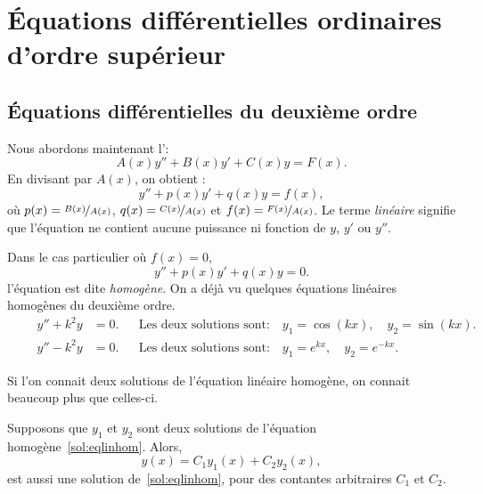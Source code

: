 \chapter{Équations différentielles ordinaires d'ordre supérieur} \label{ho:chapter}


\section{Équations différentielles du deuxième ordre}
\label{solinear:section}


Nous abordons maintenant l'\emph{}:
\begin{equation*}
	A(x) y'' + B(x)y' + C(x)y = F(x) .
\end{equation*}
En divisant par $A(x)$, on obtient : 
\begin{equation} \label{sol:eqlin}
	y'' + p(x)y' + q(x)y = f(x) ,
\end{equation}
où $p(x) = \nicefrac{B(x)}{A(x)}$, $q(x) = \nicefrac{C(x)}{A(x)}$ 
et $f(x) = \nicefrac{F(x)}{A(x)}$.
Le terme \emph{linéaire} signifie que l'équation ne contient aucune puissance ni fonction de $y$, $y'$ ou $y''$.

Dans le cas particulier où $f(x) = 0$,
\begin{equation} \label{sol:eqlinhom}
	y'' + p(x)y' + q(x)y = 0 .
\end{equation}
l'équation est dite \emph{homogène}. 
On a déjà vu quelques équations linéaires homogènes du deuxième ordre.
\begin{align*}
	\qquad y'' + k^2 y & = 0. &
	& \text{Les deux solutions sont:} \quad y_1 = \cos (kx), \quad y_2 = \sin(kx) . \qquad \\
	\qquad y'' - k^2 y & = 0. &
	& \text{Les deux solutions sont:} \quad y_1 = e^{kx}, \quad y_2 = e^{-kx} . \qquad
\end{align*}

Si l'on connait deux solutions de l'équation linéaire homogène, on connait beaucoup plus que celles-ci.

\begin{theorem}[Superposition]
	Supposons que $y_1$ et $y_2$ sont deux solutions de l'équation homogène~\eqref{sol:eqlinhom}.  
	Alors,
	\begin{equation*}
		y(x) = C_1 y_1(x) + C_2 y_2(x) ,
	\end{equation*}
	est aussi une solution de~\eqref{sol:eqlinhom}, pour des contantes arbitraires $C_1$ et $C_2$.
\end{theorem}

